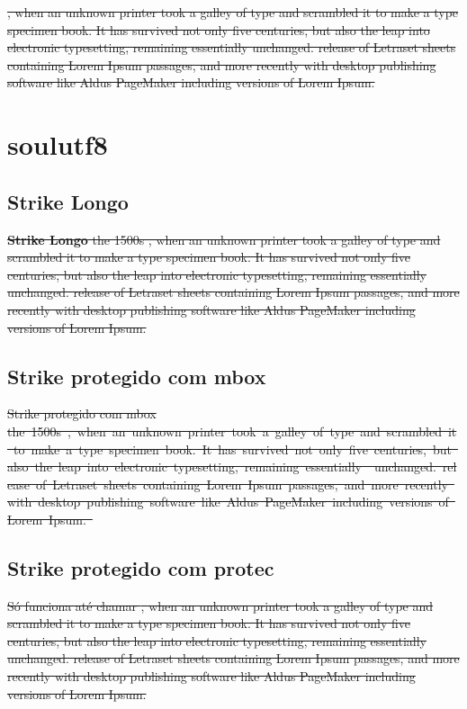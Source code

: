 \documentclass{article}
\begin{document}
\sout{\citep{b1}, when an unknown printer took a galley of type and scrambled it to make a type specimen book. It has survived not only five    centuries, but also the leap into electronic     typesetting, remaining essentially \citet{b1} unchanged. release of Letraset sheets containing Lorem Ipsum passages, and more recently with desktop publishing software like Aldus PageMaker including versions of Lorem Ipsum. \cite{b1}}


\section{soulutf8}
\subsection{Strike Longo}
\st{\textbf{Strike Longo} the 1500s , when an unknown printer took a galley of type and scrambled it to make a type specimen book. It has survived not only five    centuries, but also the leap into electronic     typesetting, remaining essentially unchanged. release of Letraset sheets containing Lorem Ipsum passages, and more recently with desktop publishing software like Aldus PageMaker including versions of Lorem Ipsum.
}
\subsection{Strike protegido com mbox}
\st{Strike protegido com mbox \mbox{the 1500s \citep{b1}, when an unknown printer took a galley of type and scrambled it to make a type specimen book. It has survived not only five    centuries, but also the leap into electronic     typesetting, remaining essentially \citet{b1} unchanged. release of Letraset sheets containing Lorem Ipsum passages, and more recently with desktop publishing software like Aldus PageMaker including versions of Lorem Ipsum.
        \cite{b1}}}

\subsection{Strike protegido com protec}
\st{Só funciona até chamar  \protect\citep{b1}, when an unknown printer took a galley of type and scrambled it to make a type specimen book. It has survived not only five    centuries, but also the leap into electronic     typesetting, remaining essentially \protect\citet{b1} unchanged. release of Letraset sheets containing Lorem Ipsum passages, and more recently with desktop publishing software like Aldus PageMaker including versions of Lorem Ipsum. \protect\cite{b1}}
\printbibliography
\end{document}
